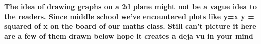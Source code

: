 \documentclass{article}
\begin{document}
\textbf{ The idea of drawing graphs on a 2d plane might not be a vague idea to the readers.  Since middle school we've encountered 
    plots like y=x y = squared of x on the board of our maths class. Still can't picture it here are a few of them drawn below hope it 
creates a deja vu in your mind }
\end{document}
